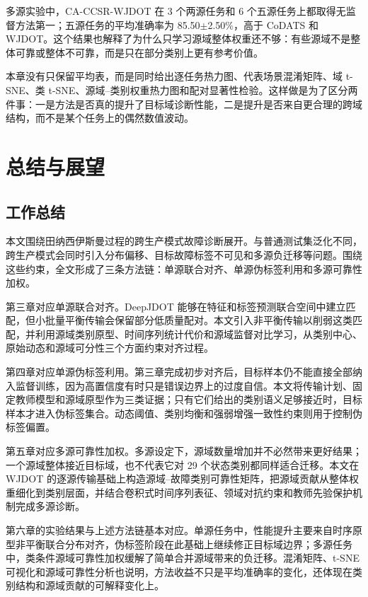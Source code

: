\documentclass{seuthesis-2022}
\begin{document}
多源实验中，CA-CCSR-WJDOT 在 3 个两源任务和 6 个五源任务上都取得无监督方法第一；五源任务的平均准确率为 85.50$\pm$2.50\%，高于 CoDATS 和 WJDOT。这个结果也解释了为什么只学习源域整体权重还不够：有些源域不是整体可靠或整体不可靠，而是只在部分类别上更有参考价值。

本章没有只保留平均表，而是同时给出逐任务热力图、代表场景混淆矩阵、域 t-SNE、类 t-SNE、源域--类别权重热力图和配对显著性检验。这样做是为了区分两件事：一是方法是否真的提升了目标域诊断性能，二是提升是否来自更合理的跨域结构，而不是某个任务上的偶然数值波动。


\chapter{总结与展望}

\section{工作总结}

本文围绕田纳西伊斯曼过程的跨生产模式故障诊断展开。与普通测试集泛化不同，跨生产模式会同时引入分布偏移、目标故障标签不可见和多源负迁移等问题。围绕这些约束，全文形成了三条方法链：单源联合对齐、单源伪标签利用和多源可靠性加权。

第三章对应单源联合对齐。DeepJDOT 能够在特征和标签预测联合空间中建立匹配，但小批量平衡传输会保留部分低质量配对。本文引入非平衡传输以削弱这类匹配，并利用源域类别原型、时间序列统计代价和源域监督对比学习，从类别中心、原始动态和源域可分性三个方面约束对齐过程。

第四章对应单源伪标签利用。第三章完成初步对齐后，目标样本仍不能直接全部纳入监督训练，因为高置信度有时只是错误边界上的过度自信。本文将传输计划、固定教师模型和源域原型作为三类证据；只有它们给出的类别语义足够接近时，目标样本才进入伪标签集合。动态阈值、类别均衡和强弱增强一致性约束则用于控制伪标签偏置。

第五章对应多源可靠性加权。多源设定下，源域数量增加并不必然带来更好结果；一个源域整体接近目标域，也不代表它对 29 个状态类别都同样适合迁移。本文在 WJDOT 的逐源传输基础上构造源域--故障类别可靠性矩阵，把源域贡献从整体权重细化到类别层面，并结合卷积式时间序列表征、领域对抗约束和教师先验保护机制完成多源诊断。

第六章的实验结果与上述方法链基本对应。单源任务中，性能提升主要来自时序原型非平衡联合分布对齐，伪标签阶段在此基础上继续修正目标域边界；多源任务中，类条件源域可靠性加权缓解了简单合并源域带来的负迁移。混淆矩阵、t-SNE 可视化和源域可靠性分析也说明，方法收益不只是平均准确率的变化，还体现在类别结构和源域贡献的可解释变化上。
\end{document}
